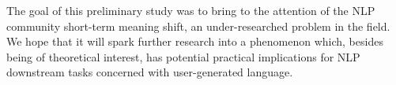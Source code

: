 
The goal of this preliminary study was to bring to the attention of the NLP community short-term meaning shift, an under-researched problem in the field. 
We hope that it will spark further research into a phenomenon which, besides being of theoretical interest, has potential practical implications for NLP downstream tasks concerned with user-generated language.



